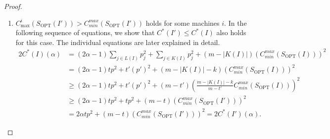 \documentclass[11pt]{article}
\newcommand{\OPT}{\mathrm{OPT}}
\newcommand{\Cminmax}{C_{min}^{max}}
\begin{document}
\begin{proof}
\begin{enumerate}[label=(\arabic*)]
Remember that any list schedule $\sigma(I')$ is optimal if
$C_{\max}^i(\sigma(I'))=\Cminmax(\sigma(I'))$ holds for all machines $i$ due to the
convexity of the square function. Furthermore, the transformation does not
change $\sum_{i=1}^m C_{\max}^i(\sigma(I))$ for any list schedule $\sigma(I)$.
Therefore, eqs. whaterber is needed here yield together with the convexity of the square
function:
\[
\begin{aligned}
        2C^*(I)(\alpha)
        &=
        (2\alpha-1)\sum_{j\in L(I)}p_j^2
        +
        \sum_{i=1}^m(C_{\max}^i(S_{\OPT}(I)))^2                 \\
        &=
        (2\alpha-1)t\cdot p^2
        +
        \sum_{i=1}^m(C_{\max}^i(S_{\OPT}(I)))^2                 \\
        &\geq
        (2\alpha-1)t\cdot p^2
        +
        m(\Cminmax(S_{\OPT}(I')))^2
        =
        2C^*(I')(\alpha).
\end{aligned}
\]

\item
$C_{\max}^i(S_{\OPT}(I'))>\Cminmax(S_{\OPT}(I'))$ holds for some machines $i$.
In the following sequence of equations, we show that $C^*(I')\leq C^*(I)$
also holds for this case. The individual equations are later explained in
detail.
\begin{align}
        2C^*(I)(\alpha)
        &=
        (2\alpha-1)\sum_{j\in L(I)}p_j^2
        +
        \sum_{j\in K(I)}p_j^2
        +
        (m-|K(I)|)(\Cminmax(S_{\OPT}(I)))^2                      \tag{7}\\
        &=
        (2\alpha-1)t p^2+t'(p')^2
        +(m-|K(I)|-k)(\Cminmax(S_{\OPT}(I)))^2                   \tag{8}\\
        &\geq
        (2\alpha-1)tp^2+t'(p')^2
        +(m-t')
        \left(
            \frac{m-|K(I)|-k}{m-t'}\Cminmax(S_{\OPT}(I))
        \right)^2                                                \tag{9}\\
        &\geq
        (2\alpha-1)tp^2+tp^2
        +(m-t)(\Cminmax(S_{\OPT}(I')))^2                         \\
        &=
        2\alpha tp^2+(m-t)(\Cminmax(S_{\OPT}(I')))^2
        =
        2C^*(I')(\alpha).                                                \tag{10}
\end{align}


\end{enumerate}
\end{proof}
\end{document}
